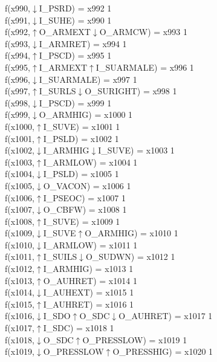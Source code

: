 f(x990,$\downarrow$I\_PSRD) = x992 {1} \\
f(x991,$\downarrow$I\_SUHE) = x990 {1} \\
f(x992,$\uparrow$O\_ARMEXT$\downarrow$O\_ARMCW) = x993 {1} \\
f(x993,$\downarrow$I\_ARMRET) = x994 {1} \\
f(x994,$\uparrow$I\_PSCD) = x995 {1} \\
f(x995,$\uparrow$I\_ARMEXT$\uparrow$I\_SUARMALE) = x996 {1} \\
f(x996,$\downarrow$I\_SUARMALE) = x997 {1} \\
f(x997,$\uparrow$I\_SURLS$\downarrow$O\_SURIGHT) = x998 {1} \\
f(x998,$\downarrow$I\_PSCD) = x999 {1} \\
f(x999,$\downarrow$O\_ARMHIG) = x1000 {1} \\
f(x1000,$\uparrow$I\_SUVE) = x1001 {1} \\
f(x1001,$\uparrow$I\_PSLD) = x1002 {1} \\
f(x1002,$\downarrow$I\_ARMHIG$\downarrow$I\_SUVE) = x1003 {1} \\
f(x1003,$\uparrow$I\_ARMLOW) = x1004 {1} \\
f(x1004,$\downarrow$I\_PSLD) = x1005 {1} \\
f(x1005,$\downarrow$O\_VACON) = x1006 {1} \\
f(x1006,$\uparrow$I\_PSEOC) = x1007 {1} \\
f(x1007,$\downarrow$O\_CBFW) = x1008 {1} \\
f(x1008,$\uparrow$I\_SUVE) = x1009 {1} \\
f(x1009,$\downarrow$I\_SUVE$\uparrow$O\_ARMHIG) = x1010 {1} \\
f(x1010,$\downarrow$I\_ARMLOW) = x1011 {1} \\
f(x1011,$\uparrow$I\_SUILS$\downarrow$O\_SUDWN) = x1012 {1} \\
f(x1012,$\uparrow$I\_ARMHIG) = x1013 {1} \\
f(x1013,$\uparrow$O\_AUHRET) = x1014 {1} \\
f(x1014,$\downarrow$I\_AUHEXT) = x1015 {1} \\
f(x1015,$\uparrow$I\_AUHRET) = x1016 {1} \\
f(x1016,$\downarrow$I\_SDO$\uparrow$O\_SDC$\downarrow$O\_AUHRET) = x1017 {1} \\
f(x1017,$\uparrow$I\_SDC) = x1018 {1} \\
f(x1018,$\downarrow$O\_SDC$\uparrow$O\_PRESSLOW) = x1019 {1} \\
f(x1019,$\downarrow$O\_PRESSLOW$\uparrow$O\_PRESSHIG) = x1020 {1} \\
